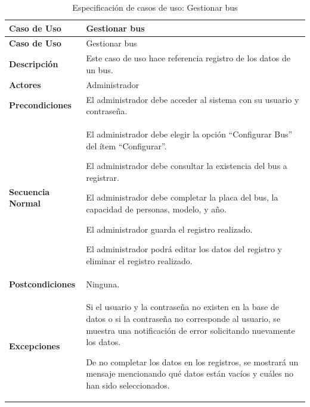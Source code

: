 	\endgroup 
	\vspace{-6pt}  %
	
	\begingroup
	\onehalfspacing
	
	\begin{longtable}{m{4cm} m{10.5cm}}
		\caption[Especificación de casos de uso: Gestionar bus]{\newline Especificación de casos de uso: Gestionar bus} \label{tab:tabla3_3}\\
		\toprule
		\textbf{Caso de Uso} & Gestionar bus \\
		\midrule
		\endfirsthead
		
		\toprule
		\textbf{Caso de Uso} & Gestionar bus \\
		\endhead
		
		
		\bottomrule
		\endlastfoot
		
		\textbf{Descripción} & Este caso de uso hace referencia registro de los datos de un bus. \\ \hline
		\textbf{Actores} & Administrador \\ \hline
		\textbf{Precondiciones} & El administrador debe acceder al sistema con su usuario y contraseña. \\ \hline
		\textbf{Secuencia Normal} & El administrador debe elegir la opción “Configurar Bus” del ítem “Configurar”.
		
		El administrador debe consultar la existencia del bus a registrar.
		
		El administrador debe completar la placa del bus, la capacidad de personas, modelo, y año.
		
		El administrador guarda el registro realizado.
		
		El administrador podrá editar los datos del registro y eliminar el registro realizado. \\ \hline
		\textbf{Postcondiciones} & Ninguna.\\ \hline
		\textbf{Excepciones} & Si el usuario y la contraseña no existen en la base de datos o si la contraseña no corresponde al usuario, se muestra una notificación de error solicitando nuevamente los datos.
		
		De no completar los datos en los registros, se mostrará un mensaje mencionando qué datos están vacíos y cuáles no han sido seleccionados. \\
	\end{longtable}
	
